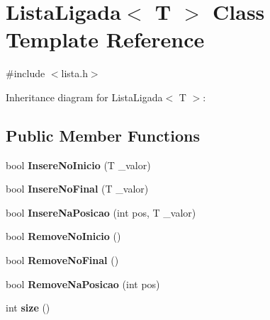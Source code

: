 \hypertarget{classListaLigada}{}\section{Lista\+Ligada$<$ T $>$ Class Template Reference}
\label{classListaLigada}


{\ttfamily \#include $<$lista.\+h$>$}



Inheritance diagram for Lista\+Ligada$<$ T $>$\+:
\subsection*{Public Member Functions}
\begin{DoxyCompactItemize}
\item 
bool {\bfseries Insere\+No\+Inicio} (T \+\_\+valor)\hypertarget{classListaLigada_ae5c528807334f89f5fa34beab6cccebf}{}\label{classListaLigada_ae5c528807334f89f5fa34beab6cccebf}

\item 
bool {\bfseries Insere\+No\+Final} (T \+\_\+valor)\hypertarget{classListaLigada_a0a7a7ca52d16deda399c51e9c32aa167}{}\label{classListaLigada_a0a7a7ca52d16deda399c51e9c32aa167}

\item 
bool {\bfseries Insere\+Na\+Posicao} (int pos, T \+\_\+valor)\hypertarget{classListaLigada_ae42913bdf31cb66ab4a0eec0e207e843}{}\label{classListaLigada_ae42913bdf31cb66ab4a0eec0e207e843}

\item 
bool {\bfseries Remove\+No\+Inicio} ()\hypertarget{classListaLigada_a96e263fe9ff0385719a67680d2d9eadc}{}\label{classListaLigada_a96e263fe9ff0385719a67680d2d9eadc}

\item 
bool {\bfseries Remove\+No\+Final} ()\hypertarget{classListaLigada_a48a1b9c8e883f6db2e0d68cfd18e0793}{}\label{classListaLigada_a48a1b9c8e883f6db2e0d68cfd18e0793}

\item 
bool {\bfseries Remove\+Na\+Posicao} (int pos)\hypertarget{classListaLigada_a5e47ccba3363b97c6223d8867f18bbf7}{}\label{classListaLigada_a5e47ccba3363b97c6223d8867f18bbf7}

\item 
int {\bfseries size} ()\hypertarget{classListaLigada_aaa0fe8d3ea92daa521f97d5aa1936ae6}{}\label{classListaLigada_aaa0fe8d3ea92daa521f97d5aa1936ae6}

\end{DoxyCompactItemize}
